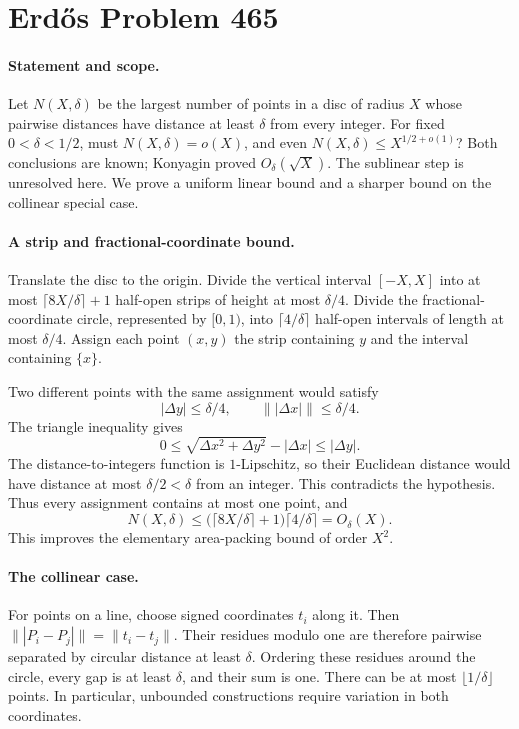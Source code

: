 \section*{Erd\H{o}s Problem 465}

\paragraph{Statement and scope.}
Let \(N(X,\delta)\) be the largest number of points in a disc of radius
\(X\) whose pairwise distances have distance at least \(\delta\)
from every integer. For fixed \(0<\delta<1/2\), must
\(N(X,\delta)=o(X)\), and even
\(N(X,\delta)\leq X^{1/2+o(1)}\)?
Both conclusions are known; Konyagin proved \(O_\delta(\sqrt X)\).
The sublinear step is unresolved here. We prove a uniform linear
bound and a sharper bound on the collinear special case.

\paragraph{A strip and fractional-coordinate bound.}
Translate the disc to the origin. Divide the vertical interval
\([-X,X]\) into at most \(\lceil8X/\delta\rceil+1\) half-open strips
of height at most \(\delta/4\).
Divide the fractional-coordinate circle, represented by \([0,1)\),
into \(\lceil4/\delta\rceil\) half-open intervals of length at most
\(\delta/4\). Assign each point \((x,y)\) the strip containing \(y\)
and the interval containing \(\{x\}\).

Two different points with the same assignment would satisfy
\[
 |\Delta y|\leq\delta/4,\qquad
 \bigl\||\Delta x|\bigr\|\leq\delta/4.
\]
The triangle inequality gives
\[
 0\leq\sqrt{\Delta x^2+\Delta y^2}-|\Delta x|
 \leq|\Delta y|.
\]
The distance-to-integers function is \(1\)-Lipschitz, so their
Euclidean distance would have distance at most \(\delta/2<\delta\)
from an integer. This contradicts the hypothesis.
Thus every assignment contains at most one point, and
\[
 N(X,\delta)\leq
 \bigl(\lceil8X/\delta\rceil+1\bigr)\lceil4/\delta\rceil
 =O_\delta(X).
 \tag{1}
\]
This improves the elementary area-packing bound of order \(X^2\).

\paragraph{The collinear case.}
For points on a line, choose signed coordinates \(t_i\) along it.
Then
\(\||P_i-P_j|\|=\|t_i-t_j\|\).
Their residues modulo one are therefore pairwise separated by
circular distance at least \(\delta\). Ordering these residues around
the circle, every gap is at least \(\delta\), and their sum is one.
There can be at most \(\lfloor1/\delta\rfloor\) points.
In particular, unbounded constructions require variation in both
coordinates.

